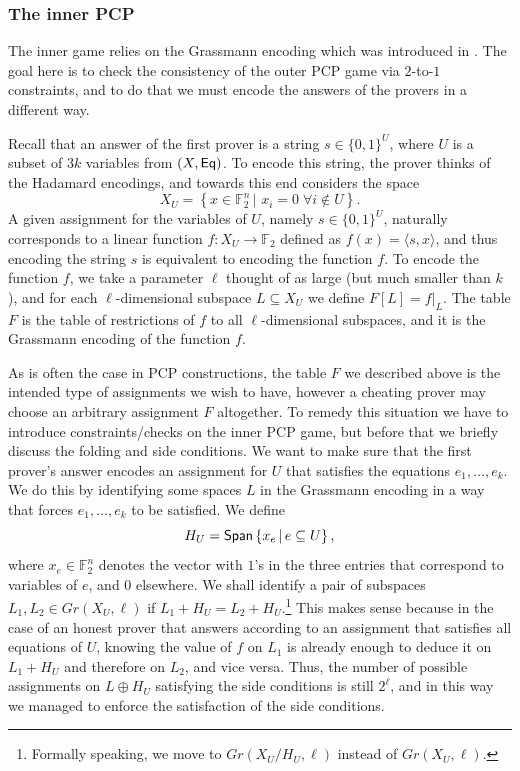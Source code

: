 \documentclass[11pt]{article}
\numberwithin{equation}{section}
\theoremstyle{definition}
\theoremstyle{plain}
\newcommand\Set[2]{ \left\{ #1 \,  \vert  \, #2\right\} }
\newcommand\spn{{\sf Span}}
\renewcommand\subset{\subseteq}
\def\F{\mathbb{F}}
\begin{document}
\subsubsection{The inner PCP}
The inner game relies on the Grassmann encoding which was introduced in \cite{KMS}.
The goal here is to check the consistency of the outer PCP game via $2$-to-$1$ constraints,
%
and to do that we must encode the answers of the provers in a different way.

Recall that an answer of the first prover is a string $s\in \{0,1\}^{U}$, where $U$ is a subset of $3k$ variables from
$(X,{\sf Eq})$. To encode this string, the prover thinks of the Hadamard encodings, and towards this end considers the space
\begin{equation}\label{eq:XU}
 X_U = \Set { x\in \F_2^n } {\, x_i=0 \;\forall i\not\in U}.
 \end{equation}
A given assignment for the variables of $U$, namely $s\in \{0,1\}^{U}$, naturally corresponds to a linear
function $f:X_U\to\F_2$ defined as $f(x) = \langle s, x\rangle$, and thus encoding the string $s$ is equivalent
to encoding the function $f$.
To encode the function $f$, we take a parameter $\ell$ thought of as large (but much smaller than $k$), and for each $\ell$-dimensional subspace $L\subset X_U$ we define $F[L] = f|_{L}$. The table $F$ is the table of restrictions of $f$ to all $\ell$-dimensional subspaces, and it is the
Grassmann encoding of the function $f$.



As is often the case in PCP constructions, the table $F$ we described above is the intended type of assignments we wish to have, however a cheating
prover may choose an arbitrary assignment $F$ altogether. To remedy this situation we have to introduce constraints/checks %
on the inner PCP game,
but before that we briefly discuss the folding and side conditions. We want to make sure that the first prover's answer encodes an assignment for $U$ that satisfies the equations $e_1,\ldots,e_k$. We do this by identifying some spaces $L$ in the Grassmann encoding in a way that forces $e_1,\ldots,e_k$ to be satisfied. We define
\[H_U = \spn\Set{x_{e}}{e\subset U},\]
where $x_e \in \F_2^n$ denotes the vector with $1$'s in the three entries that
correspond to variables of $e$, and $0$ elsewhere. We shall identify a pair of
subspaces $L_1,L_2\in Gr(X_U,\ell)$ if $L_1+H_U = L_2+H_U$.\footnote{Formally
  speaking, we move to $Gr(X_U/H_U,\ell)$ instead of $Gr(X_U,\ell)$.} This makes
sense because in the case of an honest prover that answers according to an
assignment that satisfies all equations of $U$, knowing the value of $f$ on $L_1$ is already enough to deduce it on $L_1+H_U $ and therefore on $L_2$, and vice versa. Thus, the number of possible assignments on $L\oplus H_U$ satisfying the side conditions is still $2^{\ell}$, and in this
way we managed to enforce the satisfaction of the side conditions.
\end{document}

